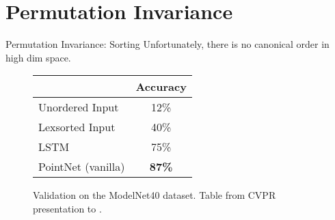 \section{Permutation Invariance}
\begin{frame}[c]{Permutation Invariance: Sorting}
    \Large
    Unfortunately, there is no canonical order in high dim space.
    \begin{figure}
        \begin{tabular}{l|c}
            & Accuracy \\ \hline
            Unordered Input & 12\% \\
            Lexsorted Input & 40\% \\
            LSTM & 75\% \\
            PointNet (vanilla) & \textbf{87\%} \\
        \end{tabular}
        \caption{Validation on the ModelNet40 dataset. Table from CVPR presentation to \cite{qi2017pointnet}.}
    \end{figure}
\end{frame}

% 

% 


